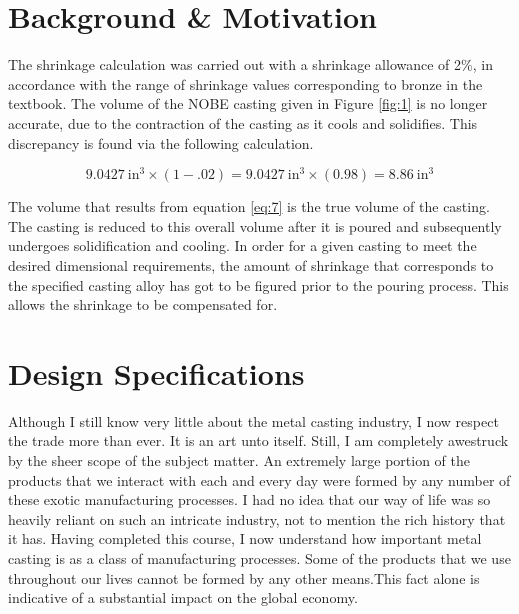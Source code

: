 \documentclass{article}
\begin{document}
 
 
\section{Background \& Motivation}



The shrinkage calculation was carried out with a shrinkage allowance of 2\%, in accordance with the range of shrinkage values corresponding to bronze in the textbook. The volume of the NOBE casting given in Figure \ref{fig:1} is no longer accurate, due to the contraction of the casting as it cools and solidifies. This discrepancy is found via the following calculation.

\begin{equation}
9.0427\ \mathrm{in^3} \times (1 - .02) = 9.0427\ \mathrm{in^3} \times (0.98) = 8.86\ \mathrm{in^3} \label{eq:7}
\end{equation}

The volume that results from equation \eqref{eq:7} is the true volume of the casting. The casting is reduced to this overall volume after it is poured and subsequently undergoes solidification and cooling. In order for a given casting to meet the desired dimensional requirements, the amount of shrinkage that corresponds to the specified casting alloy has got to be figured prior to the pouring process. This allows the shrinkage to be compensated for.

\newpage



\section{Design Specifications}



Although I still know very little about the metal casting industry, I now respect the trade more than ever. It is an art unto itself. Still, I am completely awestruck by the sheer scope of the subject matter. An extremely large portion of the products that we interact with each and every day were formed by any number of these exotic manufacturing processes. I had no idea that our way of life was so heavily reliant on such an intricate industry, not to mention the rich history that it has. Having completed this course, I now understand how important metal casting is as a class of manufacturing processes. Some of the products that we use throughout our lives cannot be formed by any other means.This fact alone is indicative of a substantial impact on the global economy.  
\end{document}
